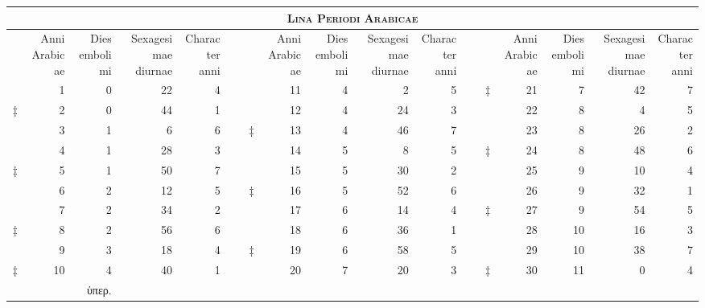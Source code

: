%
\begin{tabnums} %
\normalsize
\centering
\setlength{\tabcolsep}{1.0ex}
%
\newcommand{\cwd}{3.2em}
\newcommand{\da}{{\scriptsize †}}
\newcommand{\db}{{\scriptsize ‡}}
\newcommand{\ang}{90}
\newcommand{\hsa}[1]{\footnotesize{#1}}
\newcommand{\hsb}[1]{\tiny{#1}}
\newcommand{\hdrB}{%
  ~ &
  \hsb{\parbox[b]{\cwd}{\raggedright Anni Arabicae}} &
  \hsb{\parbox[b]{\cwd}{\raggedright Dies embolimi}} &
  \hsb{\parbox[b]{\cwd}{\raggedright Sexa\-ge\-si\-mae diurnae}} &
  \hsb{\parbox[b]{\cwd}{\raggedright Cha\-rac\-ter anni}}
}
%
\newcommand{\hdrs}{%
 \hdrB & & \hdrB & & \hdrB\\
 \cmidrule(l){1-5} \cmidrule(l){7-11} \cmidrule(l){13-17}
}
%
\begin{tabular}[c]{@{} r rrrr c r rrrr c r rrrr @{}}
\toprule
\multicolumn{17}{c}{\Large\textsc{Lina Periodi Arabicae}} \\
\toprule
\hdrs %
    &  1 & 0 & 22 & 4  &~&     & 11 & 4 &  2 & 5 &~& \db & 21 &  7 & 42 & 7\\
\db &  2 & 0 & 44 & 1  &~&     & 12 & 4 & 24 & 3 &~&     & 22 &  8 &  4 & 5\\
    &  3 & 1 &  6 & 6  &~& \db & 13 & 4 & 46 & 7 &~&     & 23 &  8 & 26 & 2\\
    &  4 & 1 & 28 & 3  &~&     & 14 & 5 &  8 & 5 &~& \db & 24 &  8 & 48 & 6\\
\db &  5 & 1 & 50 & 7  &~&     & 15 & 5 & 30 & 2 &~&     & 25 &  9 & 10 & 4\\
    &  6 & 2 & 12 & 5  &~& \db & 16 & 5 & 52 & 6 &~&     & 26 &  9 & 32 & 1\\
    &  7 & 2 & 34 & 2  &~&     & 17 & 6 & 14 & 4 &~& \db & 27 &  9 & 54 & 5\\
\db &  8 & 2 & 56 & 6  &~&     & 18 & 6 & 36 & 1 &~&     & 28 & 10 & 16 & 3\\
    &  9 & 3 & 18 & 4  &~& \db & 19 & 6 & 58 & 5 &~&     & 29 & 10 & 38 & 7\\
\db & 10 & 4 & 40 & 1  &~&     & 20 & 7 & 20 & 3 &~& \db & 30 & 11 &  0 & 4\\
\bottomrule
\addlinespace[5pt]
& \multicolumn{2}{r}{\footnotesize\super{\db}\textgreek{ὑπερ.}}
\end{tabular}
\caption{Periodi Arabicae}
\label{tab:p139a}
\end{tabnums}
